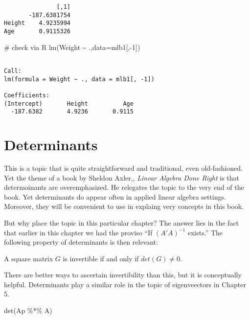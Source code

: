 \documentclass[
  letterpaper,
  DIV=11,
  numbers=noendperiod,
  oneside]{scrreprt}
\newenvironment{Shaded}{\begin{snugshade}}{\end{snugshade}}
\newcommand{\AttributeTok}[1]{\textcolor[rgb]{0.40,0.45,0.13}{#1}}
\newcommand{\CommentTok}[1]{\textcolor[rgb]{0.37,0.37,0.37}{#1}}
\newcommand{\DecValTok}[1]{\textcolor[rgb]{0.68,0.00,0.00}{#1}}
\newcommand{\FunctionTok}[1]{\textcolor[rgb]{0.28,0.35,0.67}{#1}}
\newcommand{\NormalTok}[1]{\textcolor[rgb]{0.00,0.23,0.31}{#1}}
\newcommand{\SpecialCharTok}[1]{\textcolor[rgb]{0.37,0.37,0.37}{#1}}
\begin{document}
\begin{verbatim}
               [,1]
       -187.6381754
Height    4.9235994
Age       0.9115326
\end{verbatim}

\begin{Shaded}
\begin{Highlighting}[]
\CommentTok{\# check via R}
\FunctionTok{lm}\NormalTok{(Weight }\SpecialCharTok{\textasciitilde{}}\NormalTok{ .,}\AttributeTok{data=}\NormalTok{mlb1[,}\SpecialCharTok{{-}}\DecValTok{1}\NormalTok{])}
\end{Highlighting}
\end{Shaded}

\begin{verbatim}

Call:
lm(formula = Weight ~ ., data = mlb1[, -1])

Coefficients:
(Intercept)       Height          Age  
  -187.6382       4.9236       0.9115  
\end{verbatim}

\hypertarget{determinants}{%
\section{Determinants}\label{determinants}}

This is a topic that is quite straightforward and traditional, even
old-fashioned. Yet the theme of a book by Sheldon Axler,, \emph{Linear
Algebra Done Right} is that determoinants are overemphasized. He
relegates the topic to the very end of the book. Yet determinants do
appear often in applied linear algebra settings. Moreover, they will be
convenient to use in explaing very concepts in this book.

But why place the topic in this particular chapter? The answer lies in
the fact that earlier in this chapter we had the proviso ``If
\((A'A)^{-1}\) exists.'' The following property of determinants is then
relevant:

A square matrix \(G\) is invertible if and only if \(det(G) \neq 0\).

There are better ways to ascertain invertibility than this, but it is
conceptually helpful. Determinants play a similar role in the topic of
eigenveectors in Chapter 5.

\begin{Shaded}
\begin{Highlighting}[]
\FunctionTok{det}\NormalTok{(Ap }\SpecialCharTok{\%*\%}\NormalTok{ A) }
\end{Highlighting}
\end{Shaded}
\end{document}
